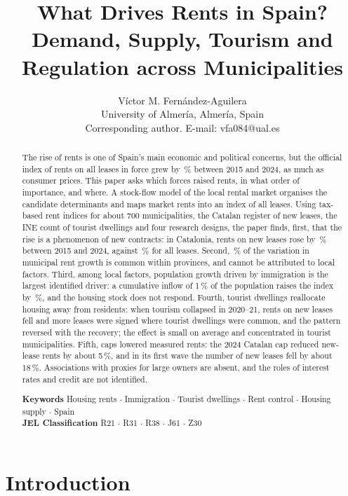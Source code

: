 \documentclass[11pt,a4paper]{article}
\title{\bfseries What Drives Rents in Spain? Demand, Supply, Tourism and Regulation across Municipalities}
\author{Víctor M. Fernández-Aguilera\\[4pt]
{\small University of Almería, Almería, Spain}\\
{\small Corresponding author. E-mail: vfa084@ual.es}}
\date{}
\begin{document}
\maketitle

\begin{abstract}\noindent
The rise of rents is one of Spain's main economic and political concerns, but the official index of rents on all leases in force grew by \ipvaGrowth\,\% between 2015 and 2024, as much as consumer prices. This paper asks which forces raised rents, in what order of importance, and where. A stock-flow model of the local rental market organises the candidate determinants and maps market rents into an index of all leases. Using tax-based rent indices for about 700 municipalities, the Catalan register of new leases, the INE count of tourist dwellings and four research designs, the paper finds, first, that the rise is a phenomenon of new contracts: in Catalonia, rents on new leases rose by \catNew\,\% between 2015 and 2024, against \catStock\,\% for all leases. Second, \vsLdProv\,\% of the variation in municipal rent growth is common within provinces, and cannot be attributed to local factors. Third, among local factors, population growth driven by immigration is the largest identified driver: a cumulative inflow of 1\,\% of the population raises the index by \bPop\,\%, and the housing stock does not respond. Fourth, tourist dwellings reallocate housing away from residents: when tourism collapsed in 2020--21, rents on new leases fell and more leases were signed where tourist dwellings were common, and the pattern reversed with the recovery; the effect is small on average and concentrated in tourist municipalities. Fifth, caps lowered measured rents: the 2024 Catalan cap reduced new-lease rents by about 5\,\%, and in its first wave the number of new leases fell by about 18\,\%. Associations with proxies for large owners are absent, and the roles of interest rates and credit are not identified.

\medskip\noindent\textbf{Keywords} Housing rents $\cdot$ Immigration $\cdot$ Tourist dwellings $\cdot$ Rent control $\cdot$ Housing supply $\cdot$ Spain\\
\textbf{JEL Classification} R21 $\cdot$ R31 $\cdot$ R38 $\cdot$ J61 $\cdot$ Z30
\end{abstract}
\clearpage
\linenumbers

\section{Introduction}\label{sec:intro}
\end{document}
